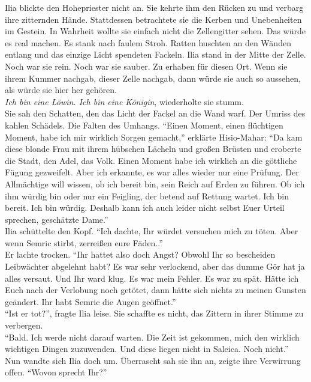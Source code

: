 Ilia blickte den Hohepriester nicht an. Sie kehrte ihm den Rücken zu und verbarg ihre zitternden 
Hände. Stattdessen betrachtete sie die Kerben und Unebenheiten im Gestein. In Wahrheit wollte sie 
einfach nicht die Zellengitter sehen. Das würde es real machen. Es stank nach faulem Stroh. Ratten 
huschten an den Wänden entlang und das einzige Licht spendeten Fackeln. Ilia stand in 
der Mitte der Zelle. Noch war sie rein. Noch war sie sauber. Zu erhaben für diesen Ort. Wenn sie 
ihrem Kummer nachgab, dieser Zelle nachgab, dann würde sie auch so aussehen, als würde sie hier her 
gehören.\\
\textit{Ich bin eine Löwin. Ich bin eine Königin}, wiederholte sie stumm.\\
Sie sah den Schatten, den das Licht der Fackel an die Wand warf. Der Umriss des kahlen Schädels. 
Die Falten des Umhangs. ``Einen Moment, einen flüchtigen Moment, habe ich mir wirklich Sorgen 
gemacht,'' erklärte Hisio-Mahar: ``Da kam diese blonde Frau mit ihrem hübschen Lächeln und großen 
Brüsten und eroberte die Stadt, den Adel, das Volk. Einen Moment habe ich wirklich an die göttliche 
Fügung gezweifelt. Aber ich erkannte, es war alles wieder nur eine Prüfung. Der Allmächtige will 
wissen, ob ich bereit bin, sein Reich auf Erden zu führen. Ob ich ihm würdig bin oder nur ein 
Feigling, der betend auf Rettung wartet. Ich bin bereit. Ich bin würdig. Deshalb kann ich auch 
leider nicht selbst Euer Urteil sprechen, geschätzte Dame.''\\
Ilia schüttelte den Kopf. ``Ich dachte, Ihr würdet versuchen mich zu töten. Aber wenn Semric 
stirbt, zerreißen eure Fäden..''\\
Er lachte trocken. ``Ihr hattet also doch Angst? Obwohl Ihr so bescheiden Leibwächter abgelehnt 
habt? Es war sehr verlockend, aber das dumme Gör hat ja alles versaut. Und Ihr ward klug. Es war 
mein Fehler. Es war zu spät. Hätte ich Euch nach der Verlobung noch getötet, dann hätte sich nichts 
zu meinen Gunsten geändert. Ihr habt Semric die Augen geöffnet.''\\
``Ist er tot?'', fragte Ilia leise. Sie schaffte es nicht, das Zittern in ihrer Stimme zu 
verbergen.\\
``Bald. Ich werde nicht darauf warten. Die Zeit ist gekommen, mich den wirklich wichtigen Dingen 
zuzuwenden. Und diese liegen nicht in Saleica. Noch nicht.''\\
Nun wandte sich Ilia doch um. Überrascht sah sie ihn an, zeigte ihre Verwirrung offen. ``Wovon 
sprecht Ihr?''\\
